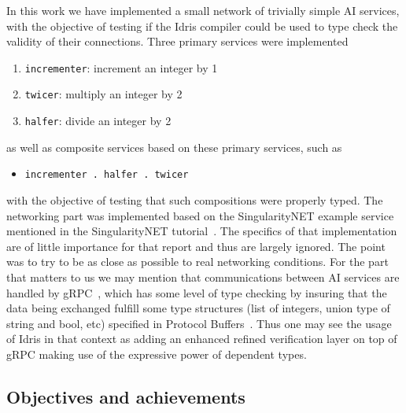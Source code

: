 \documentclass[]{report}
\begin{document}
In this work we have implemented a small network of trivially simple
AI services, with the objective of testing if the Idris compiler could
be used to type check the validity of their connections. Three primary
services were implemented
\begin{enumerate}
\item \texttt{incrementer}: increment an integer by 1
\item \texttt{twicer}: multiply an integer by 2
\item \texttt{halfer}: divide an integer by 2
\end{enumerate}
as well as composite services based on these primary services, such as
\begin{itemize}
\item \texttt{incrementer . halfer . twicer}
\end{itemize}
with the objective of testing that such compositions were properly
typed.  The networking part was implemented based on the
SingularityNET example service~\cite{SNETExampleService} mentioned in
the SingularityNET tutorial~\cite{SNETTutorial}.  The specifics of
that implementation are of little importance for that report and thus
are largely ignored.  The point was to try to be as close as possible
to real networking conditions.  For the part that matters to us we may
mention that communications between AI services are handled by
gRPC~\cite{gRPC}, which has some level of type checking by insuring
that the data being exchanged fulfill some type structures (list of
integers, union type of string and bool, etc) specified in Protocol
Buffers~\cite{Protobuf}.  Thus one may see the usage of Idris in that
context as adding an enhanced refined verification layer on top of
gRPC making use of the expressive power of dependent types.

\subsection{Objectives and achievements}
\end{document}
